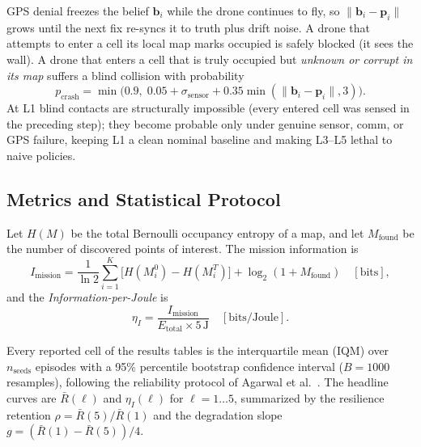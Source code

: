 \documentclass[12pt,a4paper]{article}
\DeclareRobustCommand{\vect}[1]{\bm{#1}}
\begin{document}
GPS denial freezes the belief $\vect{b}_i$ while the drone continues to fly,
so $\|\vect{b}_i - \vect{p}_i\|$ grows until the next fix re-syncs it to truth
plus drift noise. A drone that attempts to enter a cell its local map marks
occupied is safely blocked (it sees the wall). A drone that enters a cell that
is truly occupied but \emph{unknown or corrupt in its map} suffers a blind
collision with probability
\begin{equation}
p_{\mathrm{crash}} = \min\!\big(0.9,\; 0.05 + \sigma_{\mathrm{sensor}}
+ 0.35 \min(\|\vect{b}_i - \vect{p}_i\|, 3)\big).
\label{eq:crash}
\end{equation}
At L1 blind contacts are structurally impossible (every entered cell was
sensed in the preceding step); they become probable only under genuine sensor,
comm, or GPS failure, keeping L1 a clean nominal baseline and making L3--L5
lethal to naive policies.

\subsection{Metrics and Statistical Protocol}

Let $H(M)$ be the total Bernoulli occupancy entropy of a map, and let
$M_{\mathrm{found}}$ be the number of discovered points of interest. The
mission information is
\begin{equation}
I_{\mathrm{mission}}
= \frac{1}{\ln 2} \sum_{i=1}^{K}\big[H(M_i^0) - H(M_i^T)\big]
  + \log_2(1 + M_{\mathrm{found}}) \quad [\text{bits}],
\label{eq:info}
\end{equation}
and the \emph{Information-per-Joule} is
\begin{equation}
\eta_I = \frac{I_{\mathrm{mission}}}{E_{\mathrm{total}} \times 5\,\mathrm{J}}
\quad [\text{bits/Joule}].
\label{eq:etai}
\end{equation}

Every reported cell of the results tables is the interquartile mean (IQM)
over $n_{\mathrm{seeds}}$ episodes with a 95\% percentile bootstrap
confidence interval ($B = 1000$ resamples), following the reliability
protocol of Agarwal et al.~\cite{Agarwal2021deep}. The headline curves are
$\bar R(\ell)$ and $\eta_I(\ell)$ for $\ell = 1 \dots 5$, summarized by the
resilience retention $\rho = \bar R(5)/\bar R(1)$ and the degradation slope
$g = (\bar R(1) - \bar R(5))/4$.
\end{document}
